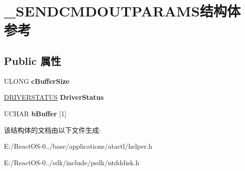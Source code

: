 \hypertarget{struct___s_e_n_d_c_m_d_o_u_t_p_a_r_a_m_s}{}\section{\+\_\+\+S\+E\+N\+D\+C\+M\+D\+O\+U\+T\+P\+A\+R\+A\+M\+S结构体 参考}
\label{struct___s_e_n_d_c_m_d_o_u_t_p_a_r_a_m_s}
\subsection*{Public 属性}
\begin{DoxyCompactItemize}
\item 
\mbox{\label{struct___s_e_n_d_c_m_d_o_u_t_p_a_r_a_m_s_abe435497ccb6062ab335202b1698cc0a}} 
U\+L\+O\+NG {\bfseries c\+Buffer\+Size}
\item 
\mbox{\label{struct___s_e_n_d_c_m_d_o_u_t_p_a_r_a_m_s_af07cddfb64c9ab5162553216d2036969}} 
\hyperlink{struct___d_r_i_v_e_r_s_t_a_t_u_s}{D\+R\+I\+V\+E\+R\+S\+T\+A\+T\+US} {\bfseries Driver\+Status}
\item 
\mbox{\label{struct___s_e_n_d_c_m_d_o_u_t_p_a_r_a_m_s_a3d749e004fe2404fc27e881654d01ac8}} 
U\+C\+H\+AR {\bfseries b\+Buffer} \mbox{[}1\mbox{]}
\end{DoxyCompactItemize}


该结构体的文档由以下文件生成\+:\begin{DoxyCompactItemize}
\item 
E\+:/\+React\+O\+S-\/0../base/applications/atactl/helper.\+h\item 
E\+:/\+React\+O\+S-\/0../sdk/include/psdk/ntdddisk.\+h\end{DoxyCompactItemize}
